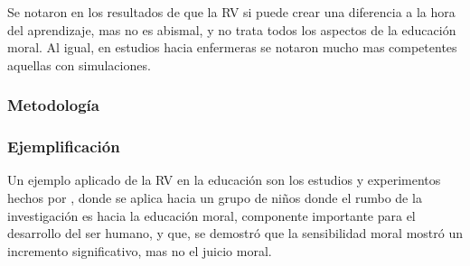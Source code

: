 Se notaron en los resultados de \cite{SHIM2023100010} que la RV si puede crear una diferencia a la hora del aprendizaje, mas no es abismal, y no trata todos los aspectos de la educación moral. Al igual, en estudios hacia enfermeras se notaron mucho mas competentes aquellas con simulaciones. 

\subsubsection{Metodología}

\subsubsection{Ejemplificación}

Un ejemplo aplicado de la RV en la educación son los estudios y experimentos hechos por \parencite{SHIM2023100010}, donde se aplica hacia un grupo de niños donde el rumbo de la investigación es hacia la educación moral, componente importante para el desarrollo del ser humano, y que, se demostró que la sensibilidad moral mostró un incremento significativo, mas no el juicio moral.
